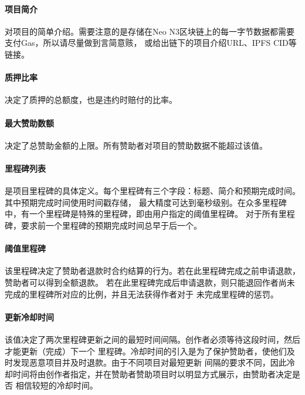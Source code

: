 \documentclass[11pt,UTF8,a4paper]{ctexart}
\begin{document}
    \paragraph{项目简介}

    对项目的简单介绍。需要注意的是存储在Neo N3区块链上的每一字节数据都需要支付Gas，所以请尽量做到言简意赅，
    或给出链下的项目介绍URL、IPFS CID等链接。

    \paragraph{质押比率}

    决定了质押的总额度，也是违约时赔付的比率。

    \paragraph{最大赞助数额}

    决定了总赞助金额的上限。所有赞助者对项目的赞助数据不能超过该值。

    \paragraph{里程碑列表}

    是项目里程碑的具体定义。每个里程碑有三个字段：标题、简介和预期完成时间。其中预期完成时间使用时间戳存储，
    最大精度可达到毫秒级别。在众多里程碑中，有一个里程碑是特殊的里程碑，即由用户指定的阈值里程碑。
    对于所有里程碑，要求前一个里程碑的预期完成时间总早于后一个。

    \paragraph{阈值里程碑}

    该里程碑决定了赞助者退款时合约结算的行为。若在此里程碑完成之前申请退款，赞助者可以得到全额退款。
    若在此里程碑完成后申请退款，则只能退回作者尚未完成的里程碑所对应的比例，并且无法获得作者对于
    未完成里程碑的惩罚。

    \paragraph{更新冷却时间}

    该值决定了两次里程碑更新之间的最短时间间隔。创作者必须等待这段时间，然后才能更新（完成）下一个
    里程碑。冷却时间的引入是为了保护赞助者，使他们及时发现恶意项目并及时退款。由于不同项目对最短更新
    间隔的要求不同，因此冷却时间将由创作者指定，并在赞助者赞助项目时以明显方式展示，由赞助者决定是否
    相信较短的冷却时间。
\end{document}
